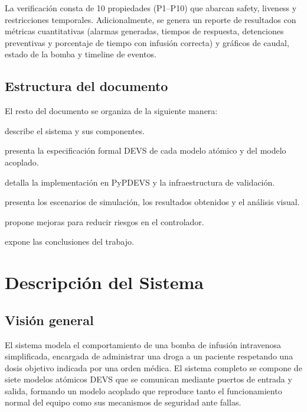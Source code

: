 \documentclass[12pt,a4paper]{article}
\begin{document}
La verificación consta de 10 propiedades (P1--P10) que abarcan safety,
liveness y restricciones temporales.  Adicionalmente, se genera un
reporte de resultados con métricas cuantitativas (alarmas generadas,
tiempos de respuesta, detenciones preventivas y porcentaje de tiempo
con infusión correcta) y gráficos de caudal, estado de la bomba y
timeline de eventos.

\subsection{Estructura del documento}

El resto del documento se organiza de la siguiente manera:

\begin{description}[leftmargin=2.5cm, style=nextline]
    \item[Sección 2:] describe el sistema y sus componentes.
    \item[Sección 3:] presenta la especificación formal DEVS de cada
          modelo atómico y del modelo acoplado.
    \item[Sección 4:] detalla la implementación en PyPDEVS y la
          infraestructura de validación.
    \item[Sección 5:] presenta los escenarios de simulación, los
          resultados obtenidos y el análisis visual.
    \item[Sección 6:] propone mejoras para reducir riesgos en el
          controlador.
    \item[Sección 7:] expone las conclusiones del trabajo.
\end{description}

\section{Descripción del Sistema}

\subsection{Visión general}

El sistema modela el comportamiento de una bomba de infusión intravenosa
simplificada, encargada de administrar una droga a un paciente respetando
una dosis objetivo indicada por una orden médica.  El sistema completo se
compone de siete modelos atómicos DEVS que se comunican mediante puertos
de entrada y salida, formando un modelo acoplado que reproduce tanto el
funcionamiento normal del equipo como sus mecanismos de seguridad ante
fallas.
\end{document}
